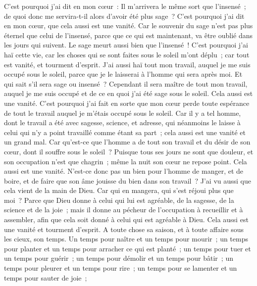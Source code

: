 \begin{multicols}{2}
C'est pourquoi j'ai dit en mon cœur~: Il m'arrivera le même sort que l'insensé~; de quoi donc me servira-t-il alors d'avoir été plus sage~? C'est pourquoi j'ai dit en mon cœur, que cela aussi est une vanité. 
Car le souvenir du sage n'est pas plus éternel que celui de l'insensé, parce que ce qui est maintenant, va être oublié dans les jours qui suivent. Le sage meurt aussi bien que l'insensé~!
C'est pourquoi j'ai haï cette vie, car les choses qui se sont faites sous le soleil m'ont déplu~; car tout est vanité, et tourment d'esprit.
J'ai aussi haï tout mon travail, auquel je me suis occupé sous le soleil, parce que je le laisserai à l'homme qui sera après moi.
Et qui sait s'il sera sage ou insensé~? Cependant il sera maître de tout mon travail, auquel je me suis occupé et de ce en quoi j'ai été sage sous le soleil. Cela aussi est une vanité.
C'est pourquoi j'ai fait en sorte que mon cœur perde toute espérance de tout le travail auquel je m'étais occupé sous le soleil.
Car il y a tel homme, dont le travail a été avec sagesse, science, et adresse, qui néanmoins le laisse à celui qui n'y a point travaillé comme étant sa part~; cela aussi est une vanité et un grand mal. 
Car qu'est-ce que l'homme a de tout son travail et du désir de son cœur, dont il souffre sous le soleil~?
Puisque tous ses jours ne sont que douleur, et son occupation n'est que chagrin~; même la nuit son cœur ne repose point. Cela aussi est une vanité.
N'est-ce donc pas un bien pour l'homme de manger, et de boire, et de faire que son âme jouisse du bien dans son travail~? J'ai vu aussi que cela vient de la main de Dieu.
Car qui en mangera, qui s'est réjoui plus que moi~?
Parce que Dieu donne à celui qui lui est agréable, de la sagesse, de la science et de la joie~; mais il donne au pécheur de l'occupation à recueillir et à assembler, afin que cela soit donné à celui qui est agréable à Dieu. Cela aussi est une vanité et tourment d'esprit.
\VerseOne{}A toute chose sa saison, et à toute affaire sous les cieux, son temps.
Un temps pour naître et un temps pour mourir~; un temps pour planter et un temps pour arracher ce qui est planté~;
un temps pour tuer et un temps pour guérir~; un temps pour démolir et un temps pour bâtir~;
un temps pour pleurer et un temps pour rire~; un temps pour se lamenter et un temps pour sauter de joie~;

\end{multicols}

